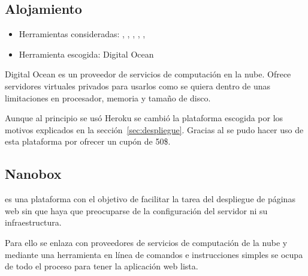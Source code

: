 \subsection{Alojamiento}

\begin{itemize}
	\tightlist
	\item Herramientas consideradas:
	,
	,
	,
	,
	,
	\item Herramienta escogida: Digital Ocean
\end{itemize}

Digital Ocean es un proveedor de servicios de computación en la nube. Ofrece
servidores virtuales privados para usarlos como se quiera dentro de unas
limitaciones en procesador, memoria y tamaño de disco.

Aunque al principio se usó Heroku se cambió la plataforma escogida por los
motivos explicados en la sección~\ref{sec:despliegue}. Gracias al
 se pudo
hacer uso de esta plataforma por ofrecer un cupón de 50\$.

\subsection{Nanobox}

 es una plataforma con el objetivo de
facilitar la tarea del despliegue de páginas web sin que haya que preocuparse de
la configuración del servidor ni su infraestructura.

Para ello se enlaza con proveedores de servicios de computación de la nube y
mediante una herramienta en línea de comandos e instrucciones simples se ocupa
de todo el proceso para tener la aplicación web lista.
